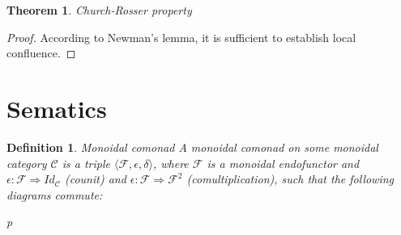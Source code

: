\documentclass[a4paper]{article}
\newtheorem{theorem}{Theorem}
\newtheorem{defin}{Definition}
\begin{document}
\begin{theorem} Church-Rosser property
\end{theorem}

\begin{proof} According to Newman's lemma, it is sufficient to establish local confluence.
\end{proof}

\section{Sematics}

\begin{defin} Monoidal comonad
  A monoidal comonad on some monoidal category $\mathcal{C}$ is a triple $\langle \mathcal{F}, \epsilon, \delta \rangle$,
  where $\mathcal{F}$ is a monoidal endofunctor and $\epsilon : \mathcal{F} \Rightarrow Id_{\mathcal{C}}$ (counit) and $\epsilon : \mathcal{F} \Rightarrow \mathcal{F}^2$ (comultiplication),
  such that the following diagrams commute:

\begin{minipage}{0.45\textwidth}
\begin{small}
\end{small}
\end{minipage}%
\hfill
\begin{minipage}{0.5\textwidth}
\begin{tabular}{p{\textwidth}}
\end{tabular}
\end{minipage}%


\end{defin}
\end{document}

